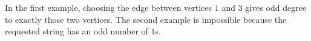 In the first example, choosing the edge between vertices $1$ and $3$ gives odd
degree to exactly those two vertices. The second example is impossible because
the requested string has an odd number of $1$s.
